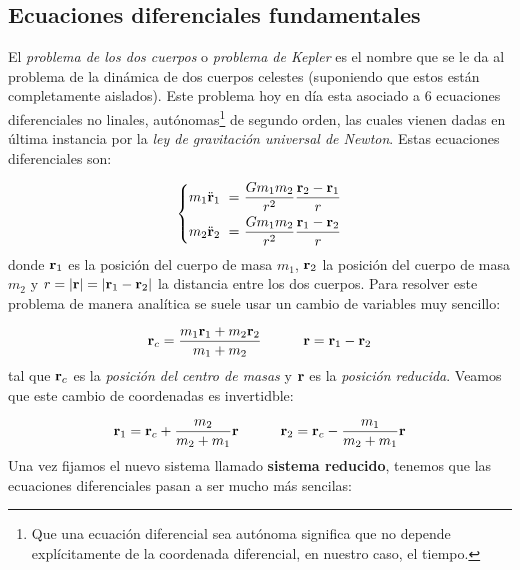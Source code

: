 \subsection{Ecuaciones diferenciales fundamentales}

El \textit{problema de los dos cuerpos} o \textit{problema de Kepler} es el nombre que se le da al problema de la dinámica de dos cuerpos celestes (suponiendo que estos están completamente aislados). Este problema hoy en día esta asociado a 6 ecuaciones diferenciales no linales, autónomas\footnote{Que una ecuación diferencial sea autónoma significa que no depende explícitamente de la coordenada diferencial, en nuestro caso, el tiempo.} de segundo orden, las cuales vienen dadas en última instancia por la \textit{ley de gravitación universal de Newton}. Estas ecuaciones diferenciales son:

\begin{equation}
	\left\lbrace
	\begin{split}
		m_1 \ddot{\mathbf{r}}_1 \ = \  & \frac{Gm_1m_2}{r^2} \frac{\mathbf{r}_2-\mathbf{r}_1}{r} \\
		m_2 \ddot{\mathbf{r}}_2 \ = \  & \frac{Gm_1m_2}{r^2} \frac{\mathbf{r}_1-\mathbf{r}_2}{r}
	\end{split} \right.
\end{equation}
donde $\mathbf{r}_1$ es la posición del cuerpo de masa $m_1$, $\mathbf{r}_2$ la posición del cuerpo de masa $m_2$ y $r=|\mathbf{r}|=|\mathbf{r}_1-\mathbf{r}_2|$ la distancia entre los dos cuerpos. Para resolver este problema de manera analítica se suele usar un cambio de variables muy sencillo:

\begin{equation}
	\mathbf{r}_c = \frac{m_1\mathbf{r}_1+m_2\mathbf{r}_2}{m_1+m_2} \quad \quad \quad \mathbf{r}=\mathbf{r}_1-\mathbf{r}_2
\end{equation}
tal que $\mathbf{r}_c$ es la \textit{posición del centro de masas} y $\mathbf{r}$ es la \textit{posición reducida}. Veamos que este cambio de coordenadas es invertidble:

\begin{equation}
	\mathbf{r}_1 = \mathbf{r}_c + \frac{m_2}{m_2+m_1} \mathbf{r}  \quad \quad \quad \mathbf{r}_2 = \mathbf{r}_c - \frac{m_1}{m_2+m_1} \mathbf{r}
\end{equation}
Una vez fijamos el nuevo sistema llamado \textbf{sistema reducido}, tenemos que las ecuaciones diferenciales pasan a ser mucho más sencilas:

